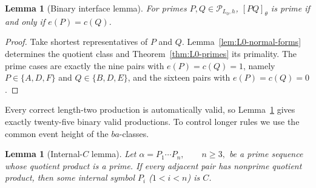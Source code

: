 \documentclass[11pt,a4paper]{article}
\newtheorem{lemma}[theorem]{Lemma}
\newcommand{\Pcal}{\mathcal P}
\begin{document}
\begin{lemma}[Binary interface lemma]
\label{lem:L0-binary-interface}
For primes $P,Q\in\Pcal_{L_0,h}$, $[PQ]_\theta$ is prime if and only if $e(P)=c(Q)$.
\end{lemma}

\begin{proof}
Take shortest representatives of $P$ and $Q$.  Lemma~\ref{lem:L0-normal-forms} determines the quotient class and Theorem~\ref{thm:L0-primes} its primality.  The prime cases are exactly the nine pairs with $e(P)=c(Q)=1$, namely
\(P\in\{A,D,F\}\) and \(Q\in\{B,D,E\}\), and the sixteen pairs with $e(P)=c(Q)=0$.
\end{proof}

Every correct length-two production is automatically valid, so
Lemma~\ref{lem:L0-binary-interface} gives exactly twenty-five binary
valid productions.  To control longer rules we use the common event
height of the $ba$-classes.

\begin{lemma}[Internal-$C$ lemma]
\label{lem:L0-internal-C}
Let
\(\alpha=P_1\cdots P_n, \qquad n\ge3,\)
be a prime sequence whose quotient product is a prime.  If every
adjacent pair has nonprime quotient product, then some internal symbol
$P_i$ ($1<i<n$) is $C$.
\end{lemma}
\end{document}
